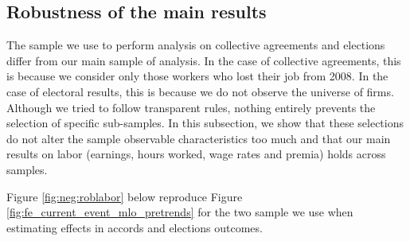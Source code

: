 \FloatBarrier
\subsection{Robustness of the main results \label{appsec:robust_samples}}
The sample we use to perform analysis on collective agreements and elections differ from our main sample of analysis. In the case of collective agreements, this is because we consider only those workers who lost their job from 2008. In the case of electoral results, this is because we do not observe the universe of firms. Although we tried to follow transparent rules, nothing entirely prevents the selection of specific sub-samples. In this subsection, we show that these selections do not alter the sample observable characteristics too much and that our main results on labor (earnings, hours worked, wage rates and premia) %
holds across samples.

Figure \ref{fig:neg:roblabor} below reproduce Figure \ref{fig:fe_current_event_mlo_pretrends} for the two sample we use when estimating effects in accords and elections outcomes. 




